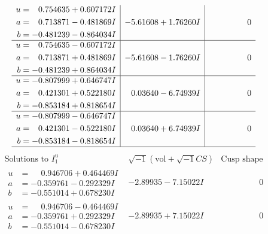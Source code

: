\documentclass[1p]{elsarticle_modified}
\theoremstyle{definition}
\newcommand{\I}{\sqrt{-1}}
\begin{document}
$$\begin{array}{c|c|c}
\begin{aligned}
u &= \phantom{-}0.754635 + 0.607172 I \\
a &= \phantom{-}0.713871 - 0.481869 I \\
b &= -0.481239 - 0.864034 I\end{aligned}
 & -5.61608 + 1.76260 I & \phantom{-0.000000 } 0 \\ \hline\begin{aligned}
u &= \phantom{-}0.754635 - 0.607172 I \\
a &= \phantom{-}0.713871 + 0.481869 I \\
b &= -0.481239 + 0.864034 I\end{aligned}
 & -5.61608 - 1.76260 I & \phantom{-0.000000 } 0 \\ \hline\begin{aligned}
u &= -0.807999 + 0.646747 I \\
a &= \phantom{-}0.421301 + 0.522180 I \\
b &= -0.853184 + 0.818654 I\end{aligned}
 & \phantom{-}0.03640 - 6.74939 I & \phantom{-0.000000 } 0 \\ \hline\begin{aligned}
u &= -0.807999 - 0.646747 I \\
a &= \phantom{-}0.421301 - 0.522180 I \\
b &= -0.853184 - 0.818654 I\end{aligned}
 & \phantom{-}0.03640 + 6.74939 I & \phantom{-0.000000 } 0\\
 \hline 
 \end{array}$$\newpage$$\begin{array}{c|c|c}  
\text{Solutions to }I^u_{1}& \I (\text{vol} + \sqrt{-1}CS) & \text{Cusp shape}\\
 \hline 
\begin{aligned}
u &= \phantom{-}0.946706 + 0.464469 I \\
a &= -0.359761 - 0.292329 I \\
b &= -0.551014 + 0.678230 I\end{aligned}
 & -2.89935 - 7.15022 I & \phantom{-0.000000 } 0 \\ \hline\begin{aligned}
u &= \phantom{-}0.946706 - 0.464469 I \\
a &= -0.359761 + 0.292329 I \\
b &= -0.551014 - 0.678230 I\end{aligned}
 & -2.89935 + 7.15022 I & \phantom{-0.000000 } 0 \\ \hline\begin{aligned}

\end{aligned}
\end{array}$$
\end{document}

